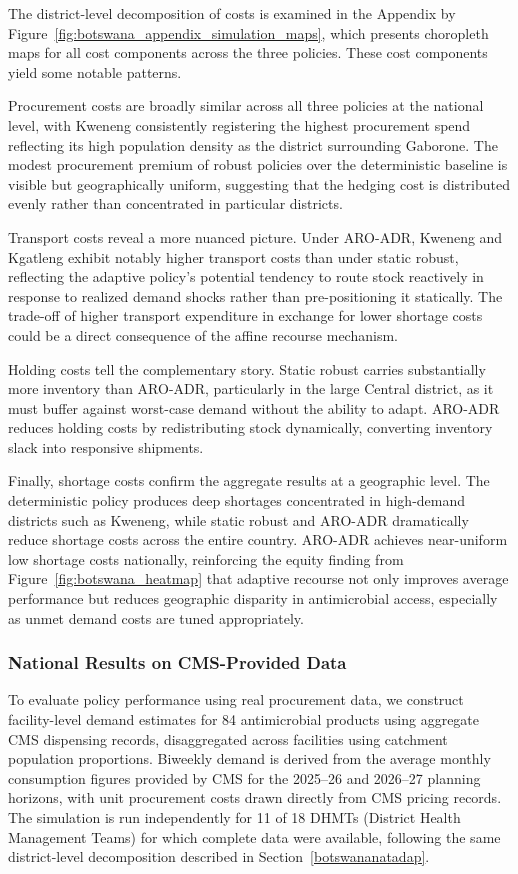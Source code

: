 \documentclass{article}
\begin{document}
The district-level decomposition of costs is examined in the Appendix by Figure~\ref{fig:botswana_appendix_simulation_maps}, which presents choropleth maps for all cost components across the three policies. These cost components yield some notable patterns.

Procurement costs are broadly similar across all three policies at the national level, with Kweneng consistently registering the highest procurement spend reflecting its high population density as the district surrounding Gaborone. The modest procurement premium of robust policies over the deterministic baseline is visible but geographically uniform, suggesting that the hedging cost is distributed evenly rather than concentrated in particular districts.

Transport costs reveal a more nuanced picture. Under ARO-ADR, Kweneng and Kgatleng exhibit notably higher transport costs than under static robust, reflecting the adaptive policy's potential tendency to route stock reactively in response to realized demand shocks rather than pre-positioning it statically. The trade-off of higher transport expenditure in exchange for lower shortage costs could be a direct consequence of the affine recourse mechanism.

Holding costs tell the complementary story. Static robust carries substantially more inventory than ARO-ADR, particularly in the large Central district, as it must buffer against worst-case demand without the ability to adapt. ARO-ADR reduces holding costs by redistributing stock dynamically, converting inventory slack into responsive shipments.

Finally, shortage costs confirm the aggregate results at a geographic level. The deterministic policy produces deep shortages concentrated in high-demand districts such as Kweneng, while static robust and ARO-ADR dramatically reduce shortage costs across the entire country. ARO-ADR achieves near-uniform low shortage costs nationally, reinforcing the equity finding from Figure~\ref{fig:botswana_heatmap} that adaptive recourse not only improves average performance but reduces geographic disparity in antimicrobial access, especially as unmet demand costs are tuned appropriately.

\subsubsection{National Results on CMS-Provided Data}
\label{cmsresults}

To evaluate policy performance using real procurement data, we construct facility-level demand estimates for 84 antimicrobial products using aggregate CMS dispensing records, disaggregated across facilities using catchment population proportions. Biweekly demand is derived from the average monthly consumption figures provided by CMS for the 2025--26 and 2026--27 planning horizons, with unit procurement costs drawn directly from CMS pricing records. The simulation is run independently for 11 of 18 DHMTs (District Health Management Teams) for which complete data were available, following the same district-level decomposition described in Section~\ref{botswananatadap}.
\end{document}
